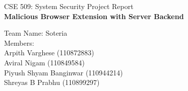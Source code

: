 \begin{titlepage}

\begin{center}
    {\Large
		CSE 509: System Security Project Report
	}\\
	\vspace{5.2cm}
	\Huge{\textbf{
			Malicious Browser Extension with Server Backend
		}}
	\end{center}
	\vspace{1.2cm}
\begin{center}
	\vspace{7.2cm}
	{\Large
	    Team Name: Soteria\\
	    Members:\\
		Arpith Varghese (110872883) \\
		Aviral Nigam (110849584)\\
		Piyush Shyam Banginwar  (110944214)\\
		Shreyas B Prabhu (⁠⁠⁠110899297)\\
	}
\end{center}
\end{titlepage}
